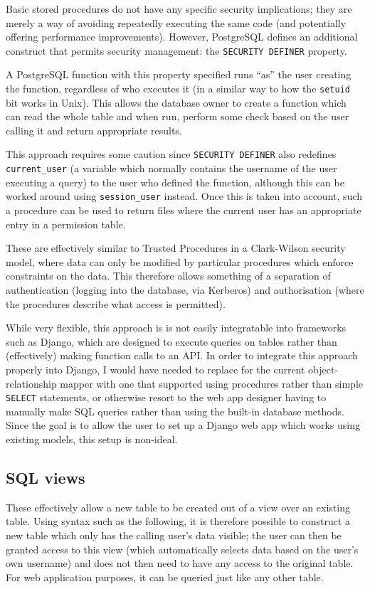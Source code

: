 \documentclass{report}
\begin{document}
Basic stored procedures do not have any specific security implications; they are merely a way of avoiding repeatedly executing the same code (and potentially offering performance improvements). However, PostgreSQL defines an additional construct that permits security management: the \texttt{SECURITY DEFINER} property.

A PostgreSQL function with this property specified runs ``as'' the user creating the function, regardless of who executes it\cite{postgres-SEC_DEF} (in a similar way to how the \texttt{setuid} bit works in Unix). This allows the database owner to create a function which can read the whole table and when run, perform some check based on the user calling it and return appropriate results.

This approach requires some caution since \texttt{SECURITY DEFINER} also redefines \verb+current_user+ (a variable which normally contains the username of the user executing a query) to the user who defined the function, although this can be worked around using \verb+session_user+ instead. Once this is taken into account, such a procedure can be used to return files where the current user has an appropriate entry in a permission table.

These are effectively similar to Trusted Procedures in a Clark-Wilson security model, where data can only be modified by particular procedures which enforce constraints on the data. This therefore allows something of a separation of authentication (logging into the database, via Kerberos) and authorisation (where the procedures describe what access is permitted).

While very flexible, this approach is is not easily integratable into frameworks such as Django, which are designed to execute queries on tables rather than (effectively) making function calls to an API. In order to integrate this approach properly into Django, I would have needed to replace for the current object-relationship mapper with one that supported using procedures rather than simple \texttt{SELECT} statements, or otherwise resort to the web app designer having to manually make SQL queries rather than using the built-in database methods. Since the goal is to allow the user to set up a Django web app which works using existing models, this setup is non-ideal.

\subsection{SQL views}
These effectively allow a new table to be created out of a view over an existing table. Using syntax such as the following, it is therefore possible to construct a new table which only has the calling user's data visible; the user can then be granted access to this view (which automatically selects data based on the user's own username) and does not then need to have any access to the original table. For web application purposes, it can be queried just like any other table.
\end{document}
